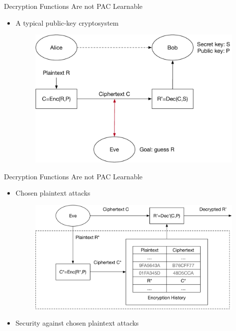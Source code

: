 \begin{frame}{Decryption Functions Are not PAC Learnable}
\begin{itemize}
    \item A typical public-key cryptosystem
    \begin{figure}
    \centering
    \includegraphics[width=.8\linewidth]{fig/PublicKeyCrypto.pdf}
    \end{figure}
\end{itemize}    
\end{frame}

\begin{frame}{Decryption Functions Are not PAC Learnable}
\begin{itemize}
    \item Chosen plaintext attacks    
\begin{figure}
\centering
\includegraphics[width=.8\linewidth]{fig/CPA.pdf}
\end{figure}
    \item Security against chosen plaintext attacks
\end{itemize}    
\end{frame}

